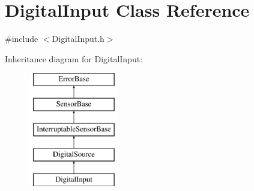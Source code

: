 \hypertarget{classDigitalInput}{\section{\-Digital\-Input \-Class \-Reference}
\label{classDigitalInput}
}


{\ttfamily \#include $<$\-Digital\-Input.\-h$>$}

\-Inheritance diagram for \-Digital\-Input\-:\begin{figure}[H]
\begin{center}
\leavevmode
\includegraphics[height=5.000000cm]{classDigitalInput}
\end{center}
\end{figure}
